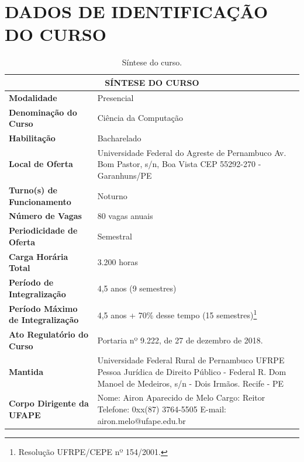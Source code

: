 \documentclass[
	12pt,				%
	openright,			%
  oneside,     %
	a4paper,			%
 hyphens,
	chapter=TITLE,		%
	english,			%
	french,				%
	spanish,			%
	brazil				%
	]{abntex2}
\begin{document}
\chapter*[Dados de Identificação do Curso]{DADOS DE IDENTIFICAÇÃO DO CURSO}


\begin{center}
  \begin{footnotesize} 
  \begin{longtable}{lp{9.4cm}}
    \caption{\label{quadro:sintese-do-curso}Síntese do curso.}\\
    \toprule
    \multicolumn{2}{c}{\bfseries SÍNTESE DO CURSO} \\
    \midrule
    \textbf{Modalidade} & Presencial \\ \midrule
    \textbf{Denominação do Curso}	& Ciência da Computação \\ \midrule
    \textbf{Habilitação}	& Bacharelado \\ \midrule
    \textbf{Local de Oferta}	& Universidade Federal do Agreste de Pernambuco \newline Av. Bom Pastor, s/n, Boa Vista \newline CEP 55292-270 - Garanhuns/PE \\ \midrule
    \textbf{Turno(s) de Funcionamento}	 & Noturno \\ \midrule
    \textbf{Número de Vagas}	& 80 vagas anuais \\ \midrule
    \textbf{Periodicidade de Oferta}	& Semestral \\ \midrule
    \textbf{Carga Horária Total} & 3.200 horas \\ \midrule
    \textbf{Período de Integralização}	& 4,5 anos (9 semestres) \\ \midrule
    \textbf{Período Máximo de Integralização} 	& 4,5 anos + 70\% desse tempo (15 semestres)\footnote{Resolução UFRPE/CEPE nº 154/2001.} \\ \midrule
    \textbf{Ato Regulatório do Curso} &	Portaria nº 9.222, de 27 de dezembro de 2018. \\ \midrule
    \textbf{Mantida}	& Universidade Federal Rural de Pernambuco UFRPE \newline Pessoa Jurídica de Direito Público - Federal \newline R. Dom Manoel de Medeiros, s/n - Dois Irmãos. Recife - PE \\ \midrule
    \textbf{Corpo Dirigente da UFAPE}	& Nome: Airon Aparecido de Melo \newline Cargo: Reitor \newline Telefone: 0xx(87) 3764-5505 \newline E-mail: airon.melo@ufape.edu.br \\
\bottomrule
\end{longtable}
\end{footnotesize}
\end{center}
\end{document}
